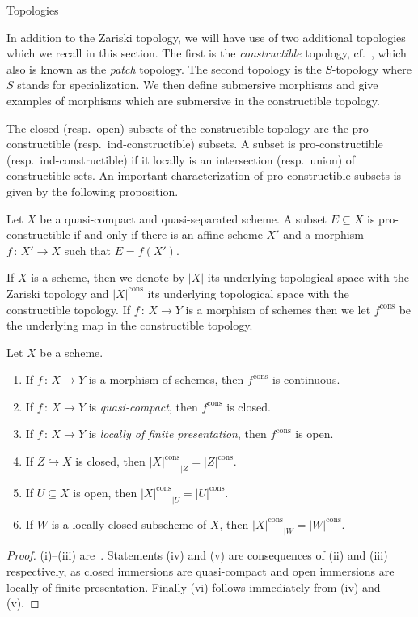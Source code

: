\documentclass[a4paper,twoside,11pt]{amsart}[2009/07/02] %
\newcommand{\inj}{\hookrightarrow}
\newcommand{\map}[3]{#1\,:\, #2\rightarrow #3}
\newcommand{\cons}{\mathrm{cons}} %
\begin{document}
\begin{section}{Topologies}

In addition to the Zariski topology, we will have use of two additional
topologies which we recall in this section. The first is the
\emph{constructible} topology, cf.~\cite[\S7.2]{egaI_NE}, which also is known
as the \emph{patch} topology. The second topology is the $S$-topology where $S$
stands for specialization. We then define submersive morphisms and give
examples of morphisms which are submersive in the constructible topology.

The closed (resp.\ open) subsets of the constructible topology are the
pro-constructible (resp.\ ind-constructible) subsets. A subset is
pro-constructible (resp.\ ind-constructible) if it locally is an intersection
(resp.\ union) of constructible sets. An important characterization of
pro-constructible subsets is given by the following proposition.

\begin{proposition}\label{P:char-of-pro-constr}
Let $X$ be a quasi-compact and quasi-separated scheme. A subset $E\subseteq X$
is pro-constructible if and only if there is an affine scheme $X'$ and
a morphism $\map{f}{X'}{X}$ such that $E=f(X')$.
\end{proposition}

If $X$ is a scheme, then we denote by $|X|$ its underlying topological space
with the Zariski topology and $|X|^{\cons}$ its underlying topological space
with the constructible topology. If $\map{f}{X}{Y}$ is a morphism of schemes
then we let $f^{\cons}$ be the underlying map in the constructible topology.

\begin{proposition}
\label{P:constructible-topology}
Let $X$ be a scheme.
\begin{enumerate}
\item If $\map{f}{X}{Y}$ is a morphism of schemes, then $f^{\cons}$ is
continuous.
\item If $\map{f}{X}{Y}$ is \emph{quasi-compact}, then $f^{\cons}$ is
closed.
\item If $\map{f}{X}{Y}$ is \emph{locally of finite presentation}, then
$f^{\cons}$ is open.
\item If $Z\inj X$ is closed, then ${|X|^{\cons}}_{|Z}=|Z|^{\cons}$.
\label{PI:CT-closed}
\item If $U\subseteq X$ is open, then ${|X|^{\cons}}_{|U}=|U|^{\cons}$.
\label{PI:CT-open}
\item If $W$ is a locally closed subscheme of $X$, then
${|X|^{\cons}}_{|W}=|W|^{\cons}$.
\label{PI:CT-loc-closed}
\end{enumerate}
\end{proposition}
\begin{proof}
(i)--(iii) are~\cite[Prop.~7.2.12~(iii)--(v)]{egaI_NE}. Statements (iv) and (v)
are consequences of (ii) and (iii) respectively, as closed immersions are
quasi-compact and open immersions are locally of finite presentation. Finally
(vi) follows immediately from (iv) and (v).
\end{proof}


\end{section}
\end{document}

